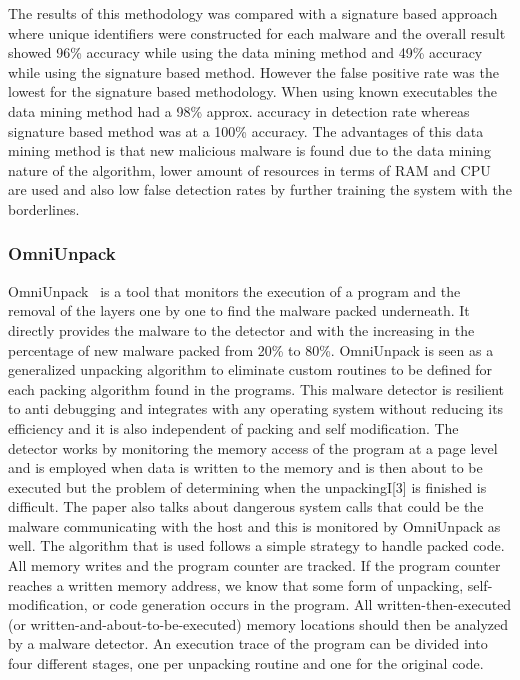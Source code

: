 \documentclass[11pt]{article}
\begin{document}
		The results of this methodology was compared with a signature based approach where unique identifiers were constructed for each malware and the overall result showed 96\% accuracy while using the data mining method and 49\% accuracy while using the signature based method. However the false positive rate was the lowest for the signature based methodology. When using known executables the data mining method had a 98\% approx. accuracy in detection rate whereas signature based method was at a 100\% accuracy. 
		The advantages of this data mining method is that new malicious malware is found due to the data mining nature of the algorithm, lower amount of resources in terms of RAM and CPU are used and also low false detection rates by further training the system with the borderlines.

		\subsubsection{OmniUnpack}
		OmniUnpack~\cite{martignoni2007omniunpack} is a tool that monitors the execution of a program and the removal of the layers one by one to find the malware packed underneath. It directly provides the malware to the detector and with the increasing in the percentage of new malware packed from 20\% to 80\%.
		OmniUnpack is seen as a generalized unpacking algorithm to eliminate custom routines to be defined for each packing algorithm found in the programs. This malware detector is resilient to anti debugging and integrates with any operating system without reducing its efficiency and it is also independent of packing and self modification.
		The detector works by monitoring the memory access of the program at a page level and is employed when data is written to the memory and is then about to be executed but the problem of determining when the unpackingI[3] is finished is difficult. The paper also talks about dangerous system calls that could be the malware communicating with the host and this is monitored by OmniUnpack as well.
		The algorithm that is used follows a simple strategy to handle packed code. All memory writes and the program counter are tracked. If the program counter reaches a written memory address, we know that some form of unpacking, self-modification, or code generation occurs in the program. All written-then-executed (or written-and-about-to-be-executed) memory locations should then be analyzed by a malware detector.	
		An execution trace of the program can be divided into four different stages, one per unpacking routine and one for the original code.
\end{document}
